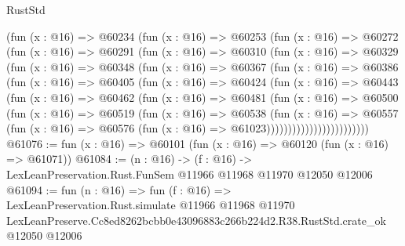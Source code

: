 \begin{lexlean}{RustStd}
\begin{coremodule}
            (fun (x : @16) =>
            @60234
              (fun (x : @16) =>
              @60253
                (fun (x : @16) =>
                @60272
                  (fun (x : @16) =>
                  @60291
                    (fun (x : @16) =>
                    @60310
                      (fun (x : @16) =>
                      @60329
                        (fun (x : @16) =>
                        @60348
                          (fun (x : @16) =>
                          @60367
                            (fun (x : @16) =>
                            @60386
                              (fun (x : @16) =>
                              @60405
                                (fun (x : @16) =>
                                @60424
                                  (fun (x : @16) =>
                                  @60443
                                    (fun (x : @16) =>
                                    @60462
                                      (fun (x : @16) =>
                                      @60481
                                        (fun (x : @16) =>
                                        @60500
                                          (fun (x : @16) =>
                                          @60519
                                            (fun (x : @16) =>
                                            @60538
                                              (fun (x : @16) =>
                                              @60557
                                                (fun (x : @16) =>
                                                @60576
                                                  (fun (x : @16) => @61023))))))))))))))))))))))))
@61076 := fun (x : @16) => @60101 (fun (x : @16) => @60120 (fun (x : @16) => @61071))
@61084 := (n : @16) ->
  (f : @16) -> LexLeanPreservation.Rust.FunSem @11966 @11968 @11970 @12050 @12006
@61094 := fun (n : @16) =>
  fun (f : @16) =>
  LexLeanPreservation.Rust.simulate
    @11966
    @11968
    @11970
    LexLeanPreserve.Cc8ed8262bcbb0e43096883c266b224d2.R38.RustStd.crate_ok
    @12050
    @12006
\end{coremodule}
\end{lexlean}
